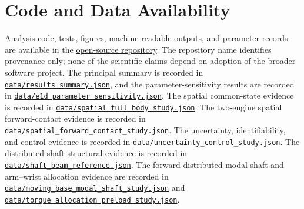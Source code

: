 \documentclass[
  letterpaper,
]{report}
\begin{document}
\chapter*{Code and Data Availability}\label{code-and-data-availability}

Analysis code, tests, figures, machine-readable outputs, and parameter
records are available in the
\href{https://github.com/D-sorganization/UpstreamDrift/tree/main/docs/research/proximal_distal_energy_transfer}{open-source
repository}. The repository name identifies provenance only; none of the
scientific claims depend on adoption of the broader software project.
The principal summary is recorded in
\href{https://github.com/D-sorganization/UpstreamDrift/blob/main/docs/research/proximal_distal_energy_transfer/data/results_summary.json}{\texttt{data/results\_summary.json}},
and the parameter-sensitivity results are recorded in
\href{https://github.com/D-sorganization/UpstreamDrift/blob/main/docs/research/proximal_distal_energy_transfer/data/e1d_parameter_sensitivity.json}{\texttt{data/e1d\_parameter\_sensitivity.json}}.
The spatial common-state evidence is recorded in
\href{https://github.com/D-sorganization/UpstreamDrift/blob/main/docs/research/proximal_distal_energy_transfer/data/spatial_full_body_study.json}{\texttt{data/spatial\_full\_body\_study.json}}.
The two-engine spatial forward-contact evidence is recorded in
\href{https://github.com/D-sorganization/UpstreamDrift/blob/main/docs/research/proximal_distal_energy_transfer/data/spatial_forward_contact_study.json}{\texttt{data/spatial\_forward\_contact\_study.json}}.
The uncertainty, identifiability, and control evidence is recorded in
\href{https://github.com/D-sorganization/UpstreamDrift/blob/main/docs/research/proximal_distal_energy_transfer/data/uncertainty_control_study.json}{\texttt{data/uncertainty\_control\_study.json}}.
The distributed-shaft structural evidence is recorded in
\href{https://github.com/D-sorganization/UpstreamDrift/blob/main/docs/research/proximal_distal_energy_transfer/data/shaft_beam_reference.json}{\texttt{data/shaft\_beam\_reference.json}}.
The forward distributed-modal shaft and arm--wrist allocation evidence
are recorded in
\href{https://github.com/D-sorganization/UpstreamDrift/blob/main/docs/research/proximal_distal_energy_transfer/data/moving_base_modal_shaft_study.json}{\texttt{data/moving\_base\_modal\_shaft\_study.json}}
and
\href{https://github.com/D-sorganization/UpstreamDrift/blob/main/docs/research/proximal_distal_energy_transfer/data/torque_allocation_preload_study.json}{\texttt{data/torque\_allocation\_preload\_study.json}}.
\end{document}
